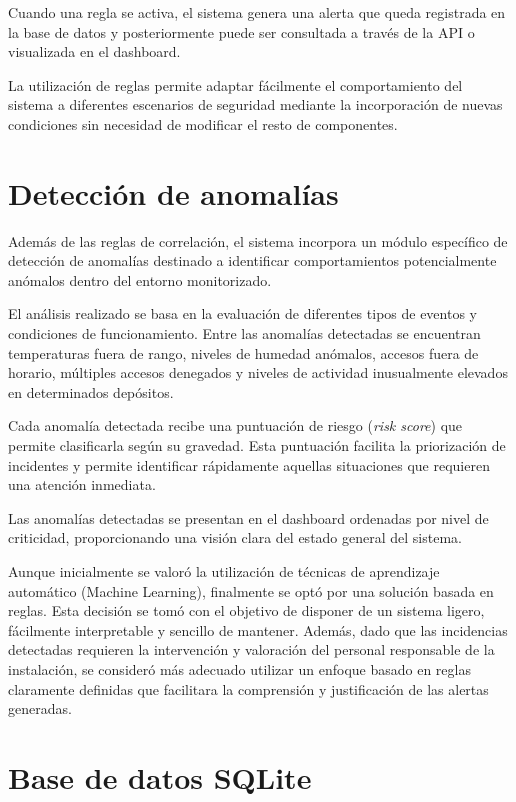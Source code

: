 Cuando una regla se activa, el sistema genera una alerta que queda registrada en la base de datos y posteriormente puede ser consultada a través de la API o visualizada en el dashboard.

La utilización de reglas permite adaptar fácilmente el comportamiento del sistema a diferentes escenarios de seguridad mediante la incorporación de nuevas condiciones sin necesidad de modificar el resto de componentes.

\section{Detección de anomalías}

Además de las reglas de correlación, el sistema incorpora un módulo específico de detección de anomalías destinado a identificar comportamientos potencialmente anómalos dentro del entorno monitorizado.

El análisis realizado se basa en la evaluación de diferentes tipos de eventos y condiciones de funcionamiento. Entre las anomalías detectadas se encuentran temperaturas fuera de rango, niveles de humedad anómalos, accesos fuera de horario, múltiples accesos denegados y niveles de actividad inusualmente elevados en determinados depósitos.

Cada anomalía detectada recibe una puntuación de riesgo (\textit{risk score}) que permite clasificarla según su gravedad. Esta puntuación facilita la priorización de incidentes y permite identificar rápidamente aquellas situaciones que requieren una atención inmediata.

Las anomalías detectadas se presentan en el dashboard ordenadas por nivel de criticidad, proporcionando una visión clara del estado general del sistema.

Aunque inicialmente se valoró la utilización de técnicas de aprendizaje automático (Machine Learning), finalmente se optó por una solución basada en reglas. Esta decisión se tomó con el objetivo de disponer de un sistema ligero, fácilmente interpretable y sencillo de mantener. Además, dado que las incidencias detectadas requieren la intervención y valoración del personal responsable de la instalación, se consideró más adecuado utilizar un enfoque basado en reglas claramente definidas que facilitara la comprensión y justificación de las alertas generadas.


\section{Base de datos SQLite}

